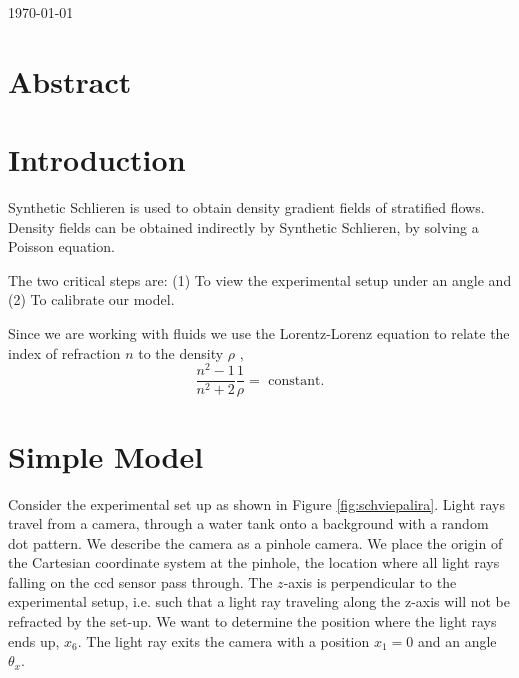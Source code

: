 \documentclass{article}
\begin{document}
\today
\section{Abstract}

\section{Introduction}


Synthetic Schlieren \cite{dalziel2000whole} is used to obtain density gradient fields of stratified flows. Density fields can be obtained indirectly by Synthetic Schlieren, by solving a Poisson equation. 

The two critical steps are: (1) To view the experimental setup under an angle and (2) To calibrate our model.

Since we are working with fluids we use the Lorentz-Lorenz equation to relate the index of refraction $n$ to the density $\rho$ \cite{lorentz1916theory, tan2015dependence},
\begin{equation}
 	\frac{n^2-1}{n^2+2} \frac{1}{\rho} = \mbox{ constant}.
\end{equation}

\section{Simple Model}
Consider the experimental set up as shown in Figure \ref{fig:schviepalira}. Light rays travel from a camera, through a water tank onto a background with a random dot pattern.  We describe the camera as a pinhole camera. We place the origin of the Cartesian coordinate system at the pinhole, the location where all light rays falling on the ccd sensor pass through. The $z$-axis is perpendicular to the experimental setup, i.e. such that a light ray traveling along the z-axis will not be refracted by the set-up. We want to determine the position where the light rays ends up, $x_6$. The light ray exits the camera with a position $x_1 = 0$ and an angle $\theta_x$. %

%	
\end{document}
